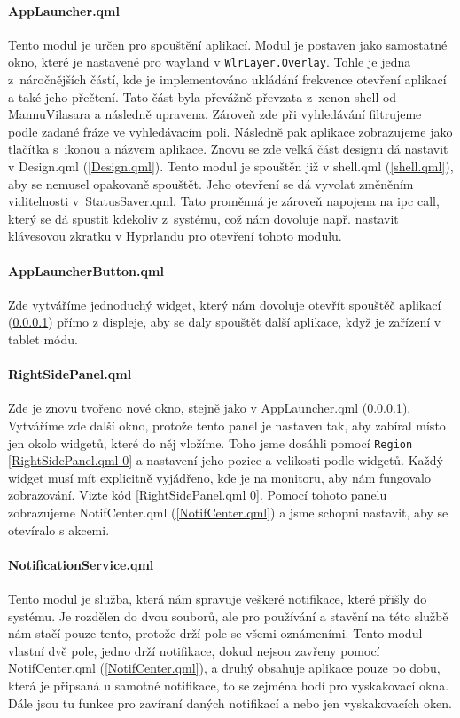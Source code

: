 \documentclass[12pt,a4paper]{article}
\begin{document}
\paragraph{AppLauncher.qml}
\label{AppLauncher.qml}
Tento modul je určen pro spouštění aplikací. Modul je postaven jako samostatné okno, které je nastavené pro wayland v 
\verb|WlrLayer.Overlay|. Tohle je jedna z~náročnějších částí, kde je implementováno ukládání frekvence otevření aplikací
a také jeho přečtení. Tato část byla převážně převzata z~xenon-shell od MannuVilasara a následně upravena.
\autocite{singhMannuVilasaraXenonshell2026} Zároveň zde při vyhledávání filtrujeme podle zadané fráze ve vyhledávacím poli.
Následně pak aplikace zobrazujeme jako tlačítka s~ikonou a názvem aplikace. Znovu se zde velká část designu dá nastavit v 
Design.qml (\ref{Design.qml}). Tento modul je spouštěn již v shell.qml (\ref{shell.qml}), aby se nemusel opakovaně spouštět.
Jeho otevření se dá vyvolat změněním viditelnosti v~StatusSaver.qml. Tato proměnná je zároveň napojena na ipc call, který
se dá spustit kdekoliv z~systému, což nám dovoluje např. nastavit klávesovou zkratku v Hyprlandu pro otevření tohoto modulu.

\paragraph{AppLauncherButton.qml}
\label{AppLauncherButton.qml}
Zde vytváříme jednoduchý widget, který nám dovoluje otevřít spouštěč aplikací (\ref{AppLauncher.qml}) přímo z displeje, aby se
daly spouštět další aplikace, když je zařízení v tablet módu. 

\paragraph{RightSidePanel.qml}
\label{RightSidePanel.qml}
Zde je znovu tvořeno nové okno, stejně jako v  AppLauncher.qml (\ref{AppLauncher.qml}). Vytváříme zde další okno, protože tento
panel je nastaven tak, aby zabíral místo jen okolo widgetů, které do něj vložíme. Toho jsme dosáhli pomocí \verb|Region|
\ref{RightSidePanel.qml 0} a nastavení jeho pozice a velikosti podle widgetů. Každý widget musí mít explicitně vyjádřeno,
kde je na monitoru, aby nám fungovalo zobrazování. Vizte kód \ref{RightSidePanel.qml 0}.
Pomocí tohoto panelu zobrazujeme NotifCenter.qml (\ref{NotifCenter.qml}) a jsme schopni nastavit, aby se otevíralo s akcemi.

\paragraph{NotificationService.qml}
\label{NotificationService.qml}
Tento modul je služba, která nám spravuje veškeré notifikace, které přišly do systému. Je rozdělen do dvou souborů, ale pro
používání a stavění na této službě nám stačí pouze tento, protože drží pole se všemi oznámeními. Tento modul vlastní dvě pole,
jedno drží notifikace, dokud nejsou zavřeny pomocí NotifCenter.qml (\ref{NotifCenter.qml}), a druhý obsahuje aplikace pouze po
dobu, která je připsaná u samotné notifikace, to se zejména hodí pro vyskakovací okna. Dále jsou tu funkce pro zavíraní daných
notifikací a nebo jen vyskakovacích oken.
\end{document}
